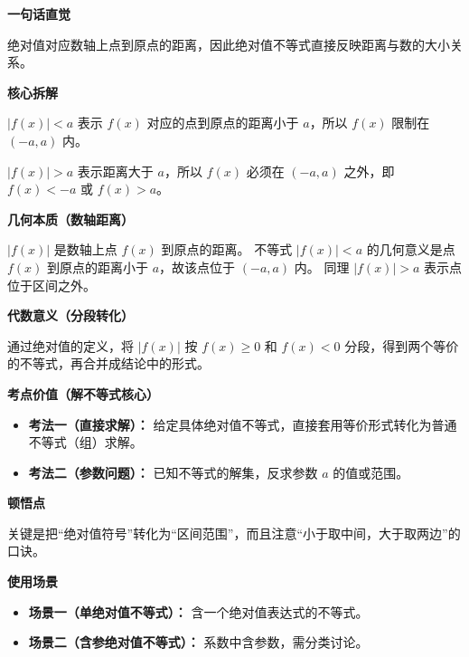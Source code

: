 \begin{explanationbox}
	\textbf{\textcolor{CExplanation}{一句话直觉}}

	绝对值对应数轴上点到原点的距离，因此绝对值不等式直接反映距离与数的大小关系。

	\medskip
	\textbf{\textcolor{CExplanation}{核心拆解}}
	\begin{description}[style=nextline, leftmargin=2.8em, labelsep=0.5em, itemsep=0.45em]
		\item[\textbf{要点一（几何意义）：}] $|f(x)|<a$ 表示 $f(x)$ 对应的点到原点的距离小于 $a$，所以 $f(x)$ 限制在 $(-a,a)$ 内。
		\item[\textbf{要点二（逻辑关系）：}] $|f(x)|>a$ 表示距离大于 $a$，所以 $f(x)$ 必须在 $(-a,a)$ 之外，即 $f(x)<-a$ 或 $f(x)>a$。
	\end{description}

	\medskip
	\textbf{\textcolor{CExplanation}{几何本质（数轴距离）}}

	$|f(x)|$ 是数轴上点 $f(x)$ 到原点的距离。 不等式 $|f(x)|<a$ 的几何意义是点 $f(x)$ 到原点的距离小于 $a$，故该点位于 $(-a,a)$ 内。 同理 $|f(x)|>a$ 表示点位于区间之外。

	\medskip
	\textbf{\textcolor{CExplanation}{代数意义（分段转化）}}

	通过绝对值的定义，将 $|f(x)|$ 按 $f(x)\ge 0$ 和 $f(x)<0$ 分段，得到两个等价的不等式，再合并成结论中的形式。

	\medskip
	\textbf{\textcolor{CExplanation}{考点价值（解不等式核心）}}
	\begin{itemize}[leftmargin=*, itemsep=0.5em, topsep=0.4em]
		\item \textbf{考法一（直接求解）：} 给定具体绝对值不等式，直接套用等价形式转化为普通不等式（组）求解。
		\item \textbf{考法二（参数问题）：} 已知不等式的解集，反求参数 $a$ 的值或范围。
	\end{itemize}

	\medskip
	\textbf{\textcolor{CExplanation}{顿悟点}}

	关键是把“绝对值符号”转化为“区间范围”，而且注意“小于取中间，大于取两边”的口诀。

	\medskip
	\textbf{\textcolor{CExplanation}{使用场景}}
	\begin{itemize}[leftmargin=*, itemsep=0.5em, topsep=0.4em]
		\item \textbf{场景一（单绝对值不等式）：} 含一个绝对值表达式的不等式。
		\item \textbf{场景二（含参绝对值不等式）：} 系数中含参数，需分类讨论。
	\end{itemize}
\end{explanationbox}

